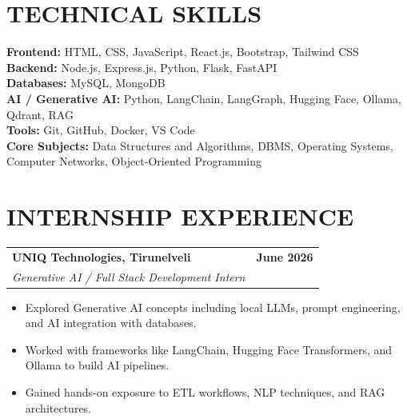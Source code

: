 \documentclass[10pt, a4paper]{article}
\begin{document}
\section{TECHNICAL SKILLS}

\textbf{Frontend:} HTML, CSS, JavaScript, React.js, Bootstrap, Tailwind CSS \\
\textbf{Backend:} Node.js, Express.js, Python, Flask, FastAPI \\
\textbf{Databases:} MySQL, MongoDB \\
\textbf{AI / Generative AI:} Python, LangChain, LangGraph, Hugging Face, Ollama, Qdrant, RAG \\
\textbf{Tools:} Git, GitHub, Docker, VS Code \\
\textbf{Core Subjects:} Data Structures and Algorithms, DBMS, Operating Systems, Computer Networks, Object-Oriented Programming

\section{INTERNSHIP EXPERIENCE}

\begin{tabularx}{\textwidth}{@{}X r@{}}
  \textbf{UNIQ Technologies, Tirunelveli} & \textbf{June 2026} \\
  \textit{Generative AI / Full Stack Development Intern} & \\
\end{tabularx}
\begin{itemize}
  \item Explored Generative AI concepts including local LLMs, prompt engineering, and AI integration with databases.
  \item Worked with frameworks like LangChain, Hugging Face Transformers, and Ollama to build AI pipelines.
  \item Gained hands-on exposure to ETL workflows, NLP techniques, and RAG architectures.
\end{itemize}

\vspace{1pt}
\end{document}
